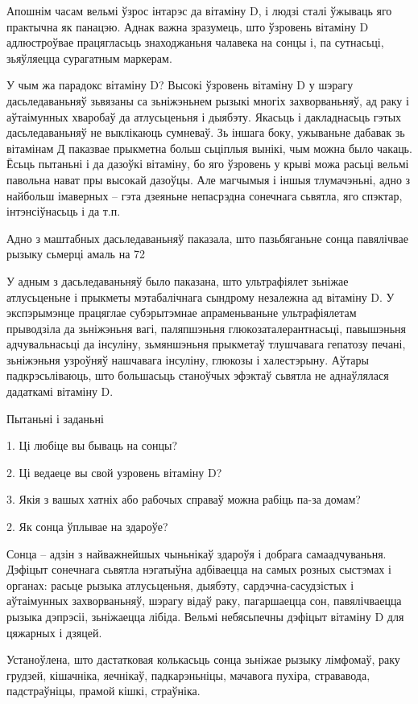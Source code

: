 Апошнім часам вельмі ўзрос інтарэс да вітаміну D, і людзі сталі ўжываць яго практычна як панацэю. Аднак важна зразумець, што ўзровень вітаміну D адлюстроўвае працягласьць знаходжаньня чалавека на сонцы і, па сутнасьці, зьяўляецца сурагатным маркерам.

У чым жа парадокс вітаміну D? Высокі ўзровень вітаміну D у шэрагу дасьледаваньняў зьвязаны са зьніжэньнем рызыкі многіх захворваньняў, ад раку і аўтаімунных хваробаў да атлусьценьня і дыябэту. Якасьць і дакладнасьць гэтых дасьледаваньняў не выклікаюць сумневаў. Зь іншага боку, ужываньне дабавак зь вітамінам Д паказвае прыкметна больш сьціплыя вынікі, чым можна было чакаць. Ёсьць пытаньні і да дазоўкі вітаміну, бо яго ўзровень у крыві можа расьці вельмі павольна нават пры высокай дазоўцы. Але магчымыя і іншыя тлумачэньні, адно з найбольш імаверных – гэта дзеяньне непасрэдна сонечнага сьвятла, яго спэктар, інтэнсіўнасьць і да т.п. 

Адно з маштабных дасьледаваньняў паказала, што пазьбяганьне сонца павялічвае рызыку сьмерці амаль на 72%

У адным з дасьледаваньняў было паказана, што ультрафіялет зьніжае атлусьценьне і прыкметы мэтабалічнага сындрому незалежна ад вітаміну D. У экспэрымэнце працяглае субэрытэмнае апраменьваньне ультрафіялетам прыводзіла да зьніжэньня вагі, паляпшэньня глюкозаталерантнасьці, павышэньня адчувальнасьці да інсуліну, зьмяншэньня прыкметаў тлушчавага гепатозу печані, зьніжэньня узроўняў нашчавага інсуліну, глюкозы і халестэрыну. Аўтары падкрэсьліваюць, што большасьць станоўчых эфэктаў сьвятла не аднаўлялася дадаткамі вітаміну D.

Пытаньні і заданьні

1. Ці любіце вы бываць на сонцы?

2. Ці ведаеце вы свой узровень вітаміну D?

3. Якія з вашых хатніх або рабочых справаў можна рабіць па-за домам?


2. Як сонца ўплывае на здароўе?

Сонца – адзін з найважнейшых чыньнікаў здароўя і добрага самаадчуваньня. Дэфіцыт сонечнага сьвятла нэгатыўна адбіваецца на самых розных сыстэмах і органах: расьце рызыка атлусьценьня, дыябэту, сардэчна-сасудзістых і аўтаімунных захворваньняў, шэрагу відаў раку, пагаршаецца сон, павялічваецца рызыка дэпрэсіі, зьніжаецца лібіда. Вельмі небясьпечны дэфіцыт вітаміну D для цяжарных і дзяцей.

Устаноўлена, што дастатковая колькасьць сонца зьніжае рызыку лімфомаў, раку грудзей, кішачніка, яечнікаў, падкарэньніцы, мачавога пухіра, стрававода, падстраўніцы, прамой кішкі, страўніка.

